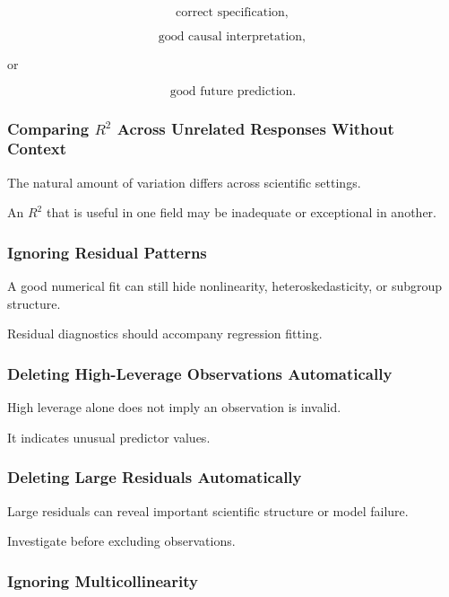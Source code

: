 \[
\boxed{
\text{correct specification},
}
\]

\[
\boxed{
\text{good causal interpretation},
}
\]

or

\[
\boxed{
\text{good future prediction}.
}
\]

\subsubsection{Comparing \(R^2\) Across Unrelated Responses Without Context}

The natural amount of variation differs across scientific settings.

An \(R^2\) that is useful in one field may be inadequate or exceptional
in another.

\subsubsection{Ignoring Residual Patterns}

A good numerical fit can still hide nonlinearity, heteroskedasticity, or
subgroup structure.

Residual diagnostics should accompany regression fitting.

\subsubsection{Deleting High-Leverage Observations Automatically}

High leverage alone does not imply an observation is invalid.

It indicates unusual predictor values.

\subsubsection{Deleting Large Residuals Automatically}

Large residuals can reveal important scientific structure or model
failure.

Investigate before excluding observations.

\subsubsection{Ignoring Multicollinearity}

